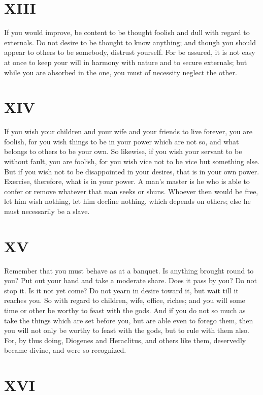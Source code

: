 \documentclass[11pt]{article}
\begin{document}
\section*{XIII}

If you would improve, be content to be thought foolish and dull with regard to externals. Do not desire to be thought to know anything; and though you should appear to others to be somebody, distrust yourself. For be assured, it is not easy at once to keep your will in harmony with nature and to secure externals; but while you are absorbed in the one, you must of necessity neglect the other.
\section*{XIV}

If you wish your children and your wife and your friends to live forever, you are foolish, for you wish things to be in your power which are not so, and what belongs to others to be your own. So likewise, if you wish your servant to be without fault, you are foolish, for you wish vice not to be vice but something else. But if you wish not to be disappointed in your desires, that is in your own power. Exercise, therefore, what is in your power. A man’s master is he who is able to confer or remove whatever that man seeks or shuns. Whoever then would be free, let him wish nothing, let him decline nothing, which depends on others; else he must necessarily be a slave.
\section*{XV}

Remember that you must behave as at a banquet. Is anything brought round to you? Put out your hand and take a moderate share. Does it pass by you? Do not stop it. Is it not yet come? Do not yearn in desire toward it, but wait till it reaches you. So with regard to children, wife, office, riches; and you will some time or other be worthy to feast with the gods. And if you do not so much as take the things which are set before you, but are able even to forego them, then you will not only be worthy to feast with the gods, but to rule with them also. For, by thus doing, Diogenes and Heraclitus, and others like them, deservedly became divine, and were so recognized.
\section*{XVI}
\end{document}
